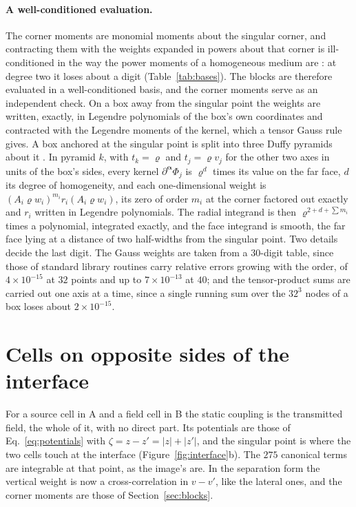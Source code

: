 \documentclass[11pt,a4paper]{article}
\newcommand{\balpha}{\boldsymbol{\alpha}}
\begin{document}
\paragraph{A well-conditioned evaluation.} The corner moments are monomial moments about the singular corner,
and contracting them with the weights expanded in powers about that corner is ill-conditioned in the way the
power moments of a homogeneous medium are \citep{NestorCoupling2026}: at degree two it loses about a digit
(Table~\ref{tab:bases}). The blocks are therefore evaluated in a well-conditioned basis, and the corner
moments serve as an independent check. On a box away from the singular point the weights are written,
exactly, in Legendre polynomials of the box's own coordinates and contracted with the Legendre moments of
the kernel, which a tensor Gauss rule gives. A box anchored at the singular point is split into three Duffy
pyramids about it \citep{Duffy1982}. In pyramid $k$, with $t_k=\varrho$ and $t_j=\varrho v_j$ for the other two
axes in units of the box's sides, every kernel $\partial^{\balpha}\Phi_j$ is $\varrho^{d}$ times its value on
the far face, $d$ its degree of homogeneity, and each one-dimensional weight is $(A_i\varrho w_i)^{m_i}r_i(A_i\varrho
w_i)$, its zero of order $m_i$ at the corner factored out exactly and $r_i$ written in Legendre polynomials.
The radial integrand is then $\varrho^{2+d+\sum m_i}$ times a polynomial, integrated exactly, and the face
integrand is smooth, the far face lying at a distance of two half-widths from the singular point. Two details
decide the last digit. The Gauss weights are taken from a $30$-digit table, since those of standard library
routines carry relative errors growing with the order, of $4\times10^{-15}$ at $32$ points and up to
$7\times10^{-13}$ at $40$; and the tensor-product sums are carried out one axis at a time, since a single
running sum over the $32^3$ nodes of a box loses about $2\times10^{-15}$.

\section{Cells on opposite sides of the interface}\label{sec:transmission}

For a source cell in A and a field cell in B the static coupling is the transmitted field, the whole of it,
with no direct part. Its potentials are those of Eq.~\eqref{eq:potentials} with $\zeta=z-z'=|z|+|z'|$, and the
singular point is where the two cells touch at the interface (Figure~\ref{fig:interface}b). The $275$
canonical terms are integrable at that point, as the image's are. In the separation form the vertical
weight is now a cross-correlation in $v-v'$, like the lateral ones, and the corner moments are those of
Section~\ref{sec:blocks}.
\end{document}
